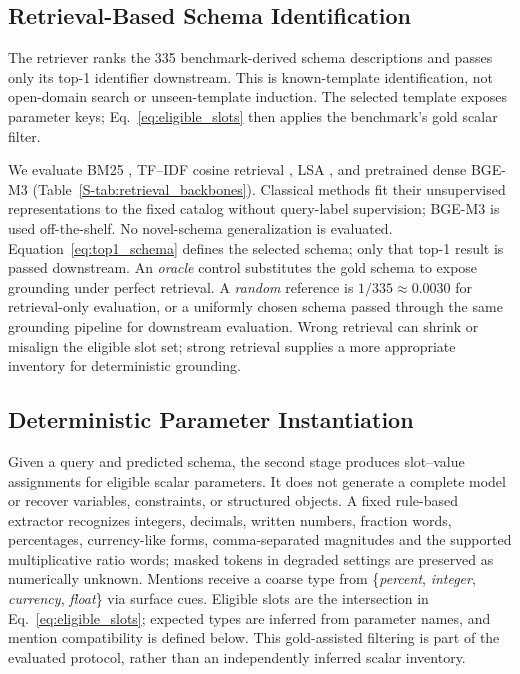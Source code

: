 \documentclass[pdflatex,sn-basic,Numbered]{sn-jnl}
\begin{document}
\subsection{Retrieval-Based Schema Identification}
\label{subsec:method_retrieval}

The retriever ranks the 335 benchmark-derived schema descriptions and passes only its top-1 identifier downstream. This is known-template identification, not open-domain search or unseen-template induction. The selected template exposes parameter keys; Eq.~\eqref{eq:eligible_slots} then applies the benchmark's gold scalar filter.

We evaluate BM25 \cite{robertson2009bm25}, TF--IDF cosine retrieval \cite{pedregosa2011sklearn}, LSA \cite{deerwester1990lsa}, and pretrained dense BGE-M3 \cite{chen2024m3embedding} (Table~\ref{S-tab:retrieval_backbones}). Classical methods fit their unsupervised representations to the fixed catalog without query-label supervision; BGE-M3 is used off-the-shelf. No novel-schema generalization is evaluated. Equation~\eqref{eq:top1_schema} defines the selected schema; only that top-1 result is passed downstream. An \emph{oracle} control substitutes the gold schema to expose grounding under perfect retrieval. A \emph{random} reference is $1/335 \approx 0.0030$ for retrieval-only evaluation, or a uniformly chosen schema passed through the same grounding pipeline for downstream evaluation. Wrong retrieval can shrink or misalign the eligible slot set; strong retrieval supplies a more appropriate inventory for deterministic grounding.



\subsection{Deterministic Parameter Instantiation}
\label{subsec:method_instantiation}

Given a query and predicted schema, the second stage produces slot--value assignments for eligible scalar parameters. It does not generate a complete model or recover variables, constraints, or structured objects. A fixed rule-based extractor recognizes integers, decimals, written numbers, fraction words, percentages, currency-like forms, comma-separated magnitudes and the supported multiplicative ratio words; masked tokens in degraded settings are preserved as numerically unknown. Mentions receive a coarse type from \{\emph{percent}, \emph{integer}, \emph{currency}, \emph{float}\} via surface cues. Eligible slots are the intersection in Eq.~\eqref{eq:eligible_slots}; expected types are inferred from parameter names, and mention compatibility is defined below. This gold-assisted filtering is part of the evaluated protocol, rather than an independently inferred scalar inventory.
\end{document}
